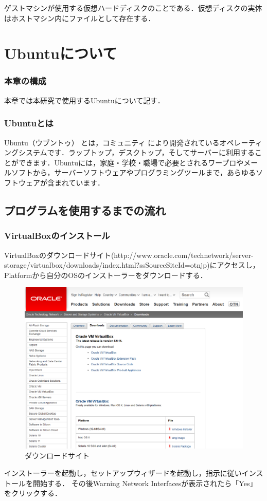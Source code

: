 ゲストマシンが使用する仮想ハードディスクのことである．仮想ディスクの実体はホストマシン内にファイルとして存在する．

\clearpage


\chapter{Ubuntuについて}

\subsection{本章の構成}
本章では本研究で使用するUbuntuについて記す．
\subsection{Ubuntuとは}

Ubuntu（ウブントゥ） とは，コミュニティ により開発されているオペレーティングシステムです．ラップトップ，デスクトップ，そしてサーバーに利用することができます．Ubuntuには，家庭・学校・職場で必要とされるワープロやメールソフトから，サーバーソフトウェアやプログラミングツールまで，あらゆるソフトウェアが含まれています\cite{Ubuntu}．



\section{プログラムを使用するまでの流れ}

\subsection{VirtualBoxのインストール}

VirtualBoxのダウンロードサイト(http://www.oracle.com/technetwork/server-storage/virtualbox/downloads/index.html?ssSourceSiteId=otnjp)にアクセスし，Platformから自分のOSのインストーラーをダウンロードする．

\begin{figure}[H]
\centering
\includegraphics[width=15cm]{virtualbox001.png}
\caption{ダウンロードサイト}\label{virtualboxダウンロードサイトの画像}
\end{figure}
インストーラーを起動し，セットアップウィザードを起動し，指示に従いインストールを開始する．
その後Warning Network Interfacesが表示されたら「Yes」をクリックする．

